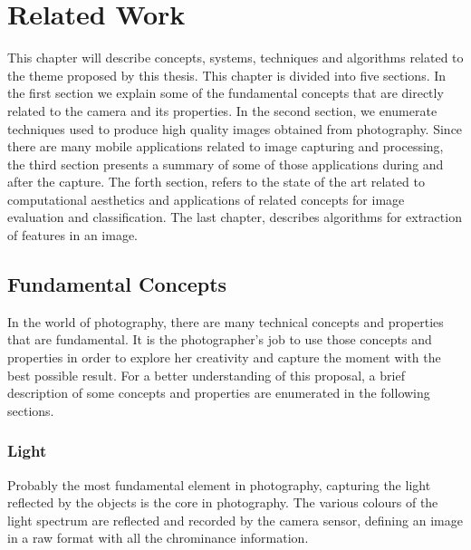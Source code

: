 \chapter{Related Work}
\label{cha:related_work}

This chapter will describe concepts, systems, techniques and algorithms related to the theme proposed by this thesis.
This chapter is divided into five sections. In the first section we explain some of the fundamental concepts that are directly related to the camera and its properties. In the second section, we enumerate techniques used to produce high quality images obtained from photography. Since there are many mobile applications related to image capturing and processing, the third section presents a summary of some of those applications during and after the capture. The forth section, refers to the state of the art related to computational aesthetics and applications of related concepts for image evaluation and classification. The last chapter, describes algorithms for extraction of features in an image.

\section{Fundamental Concepts}
\label{sec:concepts}
In the world of photography, there are many technical concepts and properties that are fundamental. It is the photographer's job to use those concepts and properties in order to explore her creativity and capture the moment with the best possible result.
For a better understanding of this proposal,  a brief description of some concepts and properties are enumerated in the following sections.

\subsection{Light}
\label{sub:light}
Probably the most fundamental element in photography, capturing the light reflected by the objects is the core in photography. The various colours of the light spectrum are reflected and recorded by the camera sensor, defining an image in a raw format with all the chrominance information.


